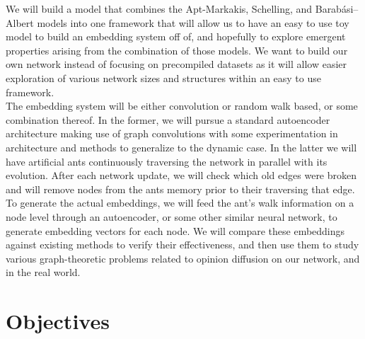 \documentclass[10pt]{article}
\begin{document}
We will build a model that combines the Apt-Markakis, Schelling, and Barabási–Albert models into one framework that will allow us to have an easy to use toy model to build an embedding system off of, and hopefully to explore emergent properties arising from the combination of those models. We want to build our own network instead of focusing on precompiled datasets as it will allow easier exploration of various network sizes and structures within an easy to use framework. \\

The embedding system will be either convolution or random walk based, or some combination thereof. In the former, we will pursue a standard autoencoder architecture making use of graph convolutions with some experimentation in architecture and methods to generalize to the dynamic case. In the latter we will have artificial ants continuously traversing the network in parallel with its evolution. After each network update, we will check which old edges were broken and will remove nodes from the ants memory prior to their traversing that edge. To generate the actual embeddings, we will feed the ant's walk information on a node level through an autoencoder, or some other similar neural network, to generate embedding vectors for each node. We will compare these embeddings against existing methods to verify their effectiveness, and then use them to study various graph-theoretic problems related to opinion diffusion on our network, and in the real world. \\

\section{Objectives}
\end{document}

